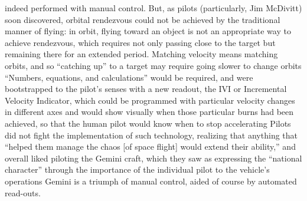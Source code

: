 indeed performed with manual control\cite[p. 84]{???-DM}. But, as
pilots (particularly, Jim McDivitt) soon discovered, orbital
rendezvous could not be achieved by the
traditional manner of flying: in orbit, flying toward an object is not
an appropriate way to achieve rendezvous, which requires not only
passing close to the target but remaining there for an extended
period. Matching velocity means matching orbits, and so ``catching
up'' to a target may require going slower to change orbits\cite[p.
  86]{???-DM} ``Numbers, equations, and calculations'' would be
required, and were bootstrapped to the pilot's senses with a new
readout, the IVI or Incremental Velocity Indicator, which could be
programmed with particular velocity changes in different axes and
would show visually when those particular burns had been achieved,
so that the human pilot would know when to stop accelerating\cite[p.
  86-87]{???-DM} Pilots did not fight the implementation of such
technology, realizing that anything that ``helped them manage the
chaos [of space flight] would extend their ability,'' and overall
liked piloting the Gemini craft, which they saw as expressing the
``national character'' through the importance of the individual pilot
to the vehicle's operations\cite[p. 88]{???-DM} Gemini is 
a triumph of manual control, aided of course by automated read-outs.

